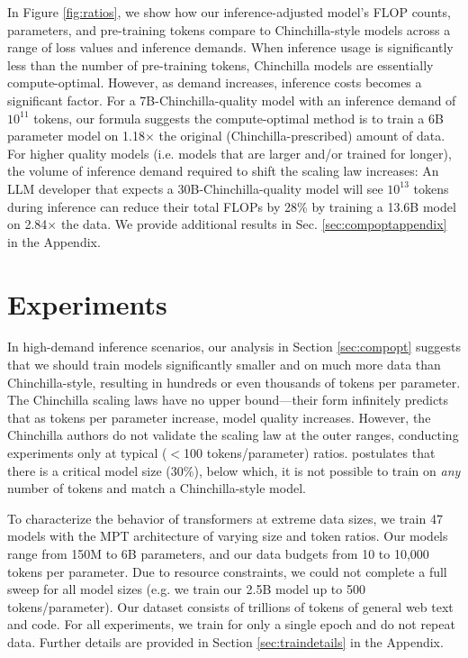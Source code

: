 \documentclass{article}
\theoremstyle{plain}
\theoremstyle{definition}
\theoremstyle{remark}
\renewcommand{\textapprox}{\raisebox{0.5ex}{\texttildelow}}
\begin{document}
In Figure \ref{fig:ratios}, we show how our inference-adjusted model's FLOP counts, parameters, and pre-training tokens compare to Chinchilla-style models across a range of loss values and inference demands. When inference usage is significantly less than the number of pre-training tokens, Chinchilla models are essentially compute-optimal. However, as demand increases, inference costs becomes a significant factor. For a 7B-Chinchilla-quality model with an inference demand of $10^{11}$ tokens, our formula suggests the compute-optimal method is to train a 6B parameter model on 1.18$\times$ the original (Chinchilla-prescribed) amount of data. For higher quality models (i.e. models that are larger and/or trained for longer), the volume of inference demand required to shift the scaling law increases: An LLM developer that expects a 30B-Chinchilla-quality model will see $10^{13}$ tokens during inference can reduce their total FLOPs by 28\% by training a 13.6B model on 2.84$\times$ the data. We provide additional results in Sec. \ref{sec:compoptappendix}
in the Appendix.



\section{Experiments}
\label{sec:experiments}
In high-demand inference scenarios, our analysis in Section \ref{sec:compopt} suggests that we should train models significantly smaller and on much more data than Chinchilla-style, resulting in hundreds or even thousands of tokens per parameter. The Chinchilla scaling laws have no upper bound---their form infinitely predicts that as tokens per parameter increase, model quality increases. However, the Chinchilla authors do not validate the scaling law at the outer ranges, conducting experiments only at typical ($<$\textapprox100 tokens/parameter) ratios. \citet{blogpost} postulates that there is a critical model size (\textapprox 30\%), below which, it is not possible to train on \textit{any} number of tokens and match a Chinchilla-style model.

To characterize the behavior of transformers at extreme data sizes, we train 47 models with the MPT architecture \cite{mpt} of varying size and token ratios. Our models range from 150M to 6B parameters, and our data budgets from 10 to 10,000 tokens per parameter. Due to resource constraints, we could not complete a full sweep for all model sizes (e.g. we train our 2.5B model up to 500 tokens/parameter). Our dataset consists of trillions of tokens of general web text and code. For all experiments, we train for only a single epoch and do not repeat data. Further details are provided in Section \ref{sec:traindetails} in the Appendix.
\end{document}
